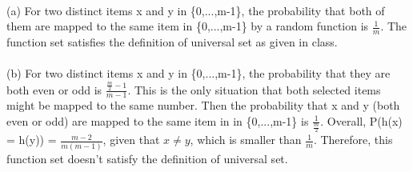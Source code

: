 \begin{problem}{4} ~\\
(a) For two distinct items x and y in \{0,...,m-1\}, the probability that both of them are mapped to the same item in \{0,...,m-1\} by a random function is $\frac{1}{m}$. The function set satisfies the definition of universal set as given in class.\\
\\
(b) For two distinct items x and y in \{0,...,m-1\}, the probability that they are both even or odd is $\frac{\frac{m}{2}-1}{m-1}$. This is the only situation that both selected items might be mapped to the same number. Then the probability that x and y (both even or odd) are mapped to the same item in in \{0,...,m-1\} is $\frac{1}{\frac{m}{2}}$. Overall, P(h(x) = h(y)) = $\frac{m-2}{m(m-1)}$, given that $x \neq y$, which is smaller than $\frac{1}{m}$. Therefore, this function set doesn't satisfy the definition of universal set.
\end{problem}